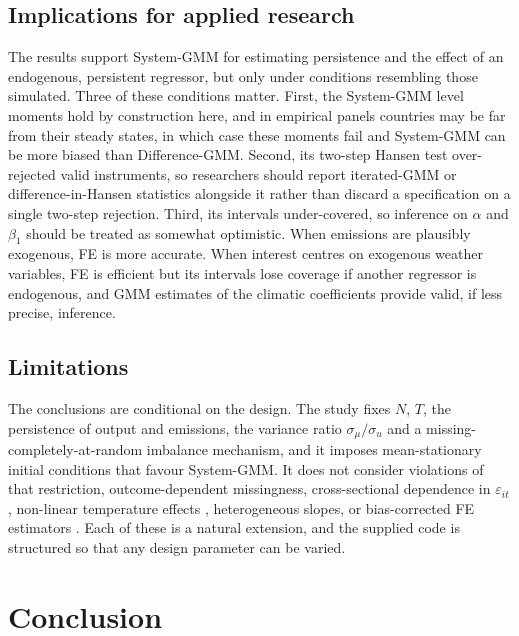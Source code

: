 \documentclass[11pt,a4paper]{article}
\begin{document}
\subsection{Implications for applied research}

The results support System-GMM for estimating persistence and the effect of an endogenous, persistent regressor, but only under conditions resembling those simulated. Three of these conditions matter. First, the System-GMM level moments hold by construction here, and in empirical panels countries may be far from their steady states, in which case these moments fail and System-GMM can be more biased than Difference-GMM. Second, its two-step Hansen test over-rejected valid instruments, so researchers should report iterated-GMM or difference-in-Hansen statistics alongside it rather than discard a specification on a single two-step rejection. Third, its intervals under-covered, so inference on $\alpha$ and $\beta_1$ should be treated as somewhat optimistic. When emissions are plausibly exogenous, FE is more accurate. When interest centres on exogenous weather variables, FE is efficient but its intervals lose coverage if another regressor is endogenous, and GMM estimates of the climatic coefficients provide valid, if less precise, inference.

\subsection{Limitations}

The conclusions are conditional on the design. The study fixes $N$, $T$, the persistence of output and emissions, the variance ratio $\sigma_\mu/\sigma_u$ and a missing-completely-at-random imbalance mechanism, and it imposes mean-stationary initial conditions that favour System-GMM. It does not consider violations of that restriction, outcome-dependent missingness, cross-sectional dependence in $\varepsilon_{it}$, non-linear temperature effects \citep{Burke2015}, heterogeneous slopes, or bias-corrected FE estimators \citep{Bruno2005}. Each of these is a natural extension, and the supplied code is structured so that any design parameter can be varied.

\section{Conclusion}\label{sec:conclusion}
\end{document}
